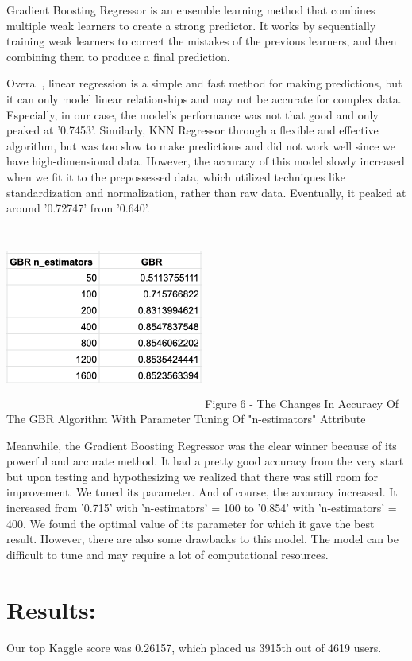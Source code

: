 \documentclass[10pt,twocolumn,letterpaper]{article}
\begin{document}
Gradient Boosting Regressor is an ensemble learning method that combines multiple weak learners to create a strong predictor. It works by sequentially training weak learners to correct the mistakes of the previous learners, and then combining them to produce a final prediction.


Overall, linear regression is a simple and fast method for making predictions, but it can only model linear relationships and may not be accurate for complex data. Especially, in our case, the model's performance was not that good and only peaked at '0.7453'. Similarly, KNN Regressor through a flexible and effective algorithm, but was too slow to make predictions and did not work well since we have high-dimensional data. However, the accuracy of this model slowly increased when we fit it to the prepossessed data, which utilized techniques like standardization and normalization, rather than raw data. Eventually, it peaked at around '0.72747' from '0.640'. 

\includegraphics[width=6.5cm,height=6cm]{Screen Shot 2022-12-15 at 6.41.42 AM.png}
Figure 6 - The Changes In Accuracy Of The GBR Algorithm With Parameter Tuning Of "n-estimators" Attribute


Meanwhile, the Gradient Boosting Regressor was the clear winner because of its  powerful and accurate method. It had a pretty good accuracy from the very start but upon testing and hypothesizing we realized that there was still room for improvement. We tuned its parameter. And of course, the accuracy increased. It increased from '0.715' with 'n-estimators' = 100 to '0.854' with 'n-estimators' = 400. We found the optimal value of its parameter for which it gave the best result. However, there are also some drawbacks to this model. The model  can be difficult to tune and may require a lot of computational resources.


\section{Results:}
Our top Kaggle score was 0.26157, which placed us 3915th out of 4619 users.
\end{document}
